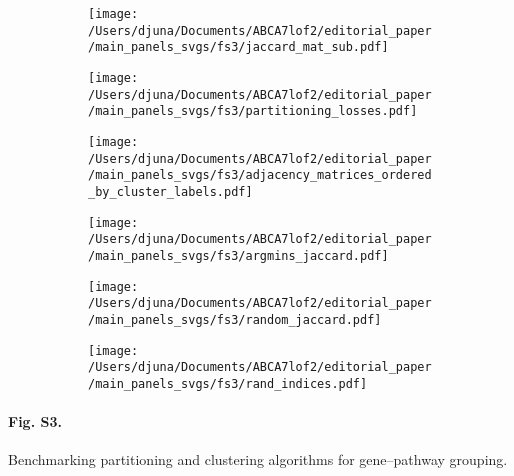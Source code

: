 \begin{figure}[H]
    \begin{subfigure}[t]{0.5\textwidth}
        \caption{}
        \centering
        \texttt{[image: /Users/djuna/Documents/ABCA7lof2/editorial\_paper/main\_panels\_svgs/fs3/jaccard\_mat\_sub.pdf]}        
    \end{subfigure}
    \begin{subfigure}[t]{0.5\textwidth}
        \caption{}
        \centering
        \texttt{[image: /Users/djuna/Documents/ABCA7lof2/editorial\_paper/main\_panels\_svgs/fs3/partitioning\_losses.pdf]}        
    \end{subfigure}
    \begin{subfigure}[t]{1\textwidth}
        \caption{}
        \texttt{[image: /Users/djuna/Documents/ABCA7lof2/editorial\_paper/main\_panels\_svgs/fs3/adjacency\_matrices\_ordered\_by\_cluster\_labels.pdf]}        
    \end{subfigure}
    \begin{subfigure}[t]{0.33\textwidth}
        \caption{}
        \centering
        \texttt{[image: /Users/djuna/Documents/ABCA7lof2/editorial\_paper/main\_panels\_svgs/fs3/argmins\_jaccard.pdf]}        
    \end{subfigure}
    \begin{subfigure}[t]{0.33\textwidth}
        \caption{}
        \centering
        \texttt{[image: /Users/djuna/Documents/ABCA7lof2/editorial\_paper/main\_panels\_svgs/fs3/random\_jaccard.pdf]}        
    \end{subfigure}
    \begin{subfigure}[t]{0.33\textwidth}
        \caption{}
        \centering
        \texttt{[image: /Users/djuna/Documents/ABCA7lof2/editorial\_paper/main\_panels\_svgs/fs3/rand\_indices.pdf]}        
    \end{subfigure}
\end{figure}

\paragraph*{Fig. S3.} Benchmarking partitioning and clustering algorithms for gene–pathway grouping.




